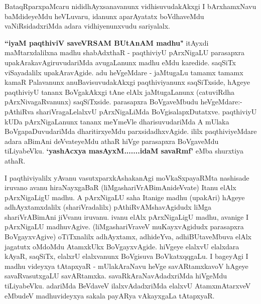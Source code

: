 \centerline{}

\begin{artha}
BataqRparxpaMcaru nididhAyxsanavanunx vidhisuvudakAkxgi I bArxhamxNavu baMdideyeMdu 
heVLuvaru, idanunx aparAyatatx boVdhaveMdu vaNiRsidadxriMda adara vidhiyenunxvudu
sariyalalx.
\end{artha}

\begin{artha}
\textbf{``iyaM paqthiviV saveVRSAM BUtAnAM madhu"} itAyxdi maMtarxdalilxna madhu shabAdxthaR - paqthiviyU 
pArxNigaLU parasapxra upakArakavAgiruvudariMda avugaLanunx madhu eMdu karedide. saqSiTx viSayadalilx upakAravAgide. adu heVgeMdare - jaMtugaLu tamamx tamamx kamaR Palavanunx 
anuBavisuvudakAkxgi paqthiviyanunx saqSiTxside, hAgeye paqthiviyU tananx BoVgakAkxgi tAne 
elAlx jaMtugaLanunx (catuviRdha pArxNivagaRvanunx) saqSiTxside. parasapxra BoVgaveMbudu 
heVgeMdare:- pAthiRva shariVragaLelalxvU pArxNigaLiMda BoVgisalapxDutatxve. paqthiviyU 
kUDa pArxNigaLanunx tananx meYmeVle dharisuvudariMda A mUlaka BoVgapaDuvudariMda 
dharitirxyeMdu parxsidadhxvAgide. ililx paqthiviyeMdare adara aBimAni deVvateyeMdu athaR hiVge parasapxra BoVgaveMdu tiLiyabeVku. \textbf{`yashAcxya masAyxM.......idaM savaRmf'} eMba shurxtiya athaR. 
\end{artha}

\centerline{}

\begin{artha}
I paqthiviyalilx yAvanu vasutxparxkAshakanAgi moVkaSxpayaRMta nashisade iruvano avanu hiraNayxgaBaR (liMgashariVrABimAnideVvate) Itanu elAlx pArxNigaLigU madhu. A pArxNigaLU saha Itanige madhu (upakAri) hAgeye adhAyxtamxdalilx (shariVradalilx) pAthiRvAMshavAgidudx liMga shariVrABimAni jiVvanu iruvanu. ivanu elAlx pArxNigaLigU madhu, avanige I pArxNigaLU madhuvAgive. (liMgashariVraveV muKayxvAgidudx parasapxra BoVgayxvAgive) oTiTxnalilx adhAyxtamx, adhideYva, adhiBUtaveMbuva elAlx jagatutx oMdoMdu AtamxkUkx BoVgayxvAgide. hiVgeye elalxvU elalxdara kAyaR, saqSiTx, elalxrU elalxvanunx BoVgisuva BoVkatxqqgaLu. I bageyAgi I madhu videyxya tAtapxyaR - mUlakAraNavu heVge savARtamxkavoV hAgeye savaRvasutxgaLU savARtamxka. savaRkAraNavAdadxriMda hiVgeMdu tiLiyabeVku. adariMda BeVdaveV ilalxvAdadxriMda elalxvU AtamxmAtarxveV eMbudeV madhuvideyxya sakala payARya vAkayxgaLa tAtapxyaR.
\end{artha}

